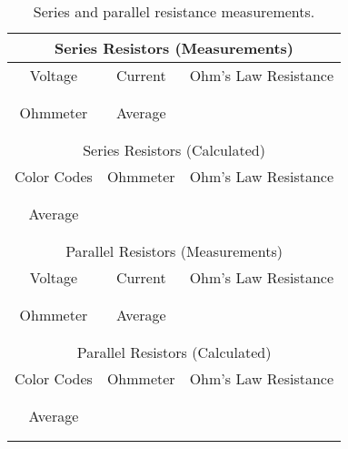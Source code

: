 \begin{table}[htb]
\begin{center}
\begin{tabular}{|c|c|c|}
\hline
\multicolumn{3}{|c|}{Series Resistors (Measurements)} \\
\hline 
Voltage & Current & Ohm's Law Resistance \\
\hline
\hspace*{3cm} & \hspace*{3cm} & \hspace*{3cm} \\ 
& &  \\ 
\hline
Ohmmeter & Average & \\ 
\hline
& &  \\
& &  \\
\hline
\hline

\multicolumn{3}{|c|}{Series Resistors (Calculated)} \\
\hline 
Color Codes & Ohmmeter & Ohm's Law Resistance \\
\hline
\hspace*{3cm} & \hspace*{3cm} & \hspace*{3cm} \\ 
& &  \\ 
\hline
Average &  & \\ 
\hline
& &  \\
& &  \\
\hline
\hline

\multicolumn{3}{|c|}{Parallel Resistors (Measurements)} \\
\hline 
Voltage & Current & Ohm's Law Resistance \\
\hline
\hspace*{3cm} & \hspace*{3cm} & \hspace*{3cm} \\ 
& &  \\ 
\hline
Ohmmeter & Average & \\
\hline
& &  \\
& &  \\
\hline
\hline

\multicolumn{3}{|c|}{Parallel Resistors (Calculated)} \\
\hline 
Color Codes & Ohmmeter & Ohm's Law Resistance \\
\hline
\hspace*{3cm} & \hspace*{3cm} & \hspace*{3cm} \\ 
& &  \\ 
\hline
Average &  & \\
\hline
& &  \\
& &  \\
\hline


\end{tabular}
\end{center}
\caption{Series and parallel resistance measurements.}
\label{tab:DC:measserpar}
\end{table}

